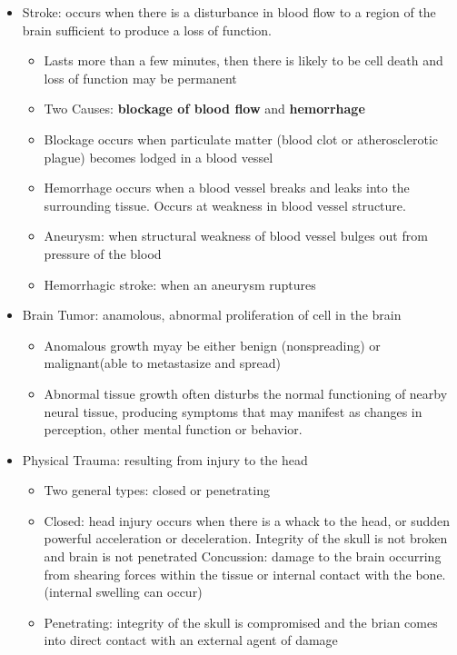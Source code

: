 \documentclass{article}
\begin{document}
\begin{itemize}
    \item Stroke: occurs when there is a disturbance in blood flow to a region of the brain sufficient to produce a loss of function. 
    \begin{itemize}
        \item Lasts more than a few minutes, then there is likely to be cell death and loss of function may be permanent
        \item Two Causes: \textbf{blockage of blood flow} and \textbf{hemorrhage}
        \item Blockage occurs when particulate matter (blood clot or atherosclerotic plague) becomes lodged in a blood vessel
        \item Hemorrhage occurs when a blood vessel breaks and leaks into the surrounding tissue. Occurs at weakness in blood vessel structure. 
        \item Aneurysm: when structural weakness of blood vessel bulges out from  pressure of the blood
        \item Hemorrhagic stroke: when an aneurysm ruptures
    \end{itemize}
    
    \item Brain Tumor: anamolous, abnormal proliferation of cell in the brain
    \begin{itemize}
        \item Anomalous growth myay be either benign (nonspreading) or malignant(able to metastasize and spread) 
        \item Abnormal tissue growth often disturbs the normal functioning of nearby neural tissue, producing symptoms that may manifest as changes in perception, other mental function or behavior. 
    \end{itemize}
    
    \item Physical Trauma: resulting from injury to the head
    \begin{itemize}
        \item Two general types: closed or penetrating
        \item Closed: head injury occurs when there is a whack to the head, or sudden powerful acceleration or deceleration. Integrity of the skull is not broken and brain is not penetrated
            \subitem Concussion: damage to the brain occurring from shearing forces within the tissue or internal contact with the bone. (internal swelling can occur) 
        \item Penetrating: integrity of the skull is compromised and the brian comes into direct contact with an external agent of damage
    \end{itemize}
    

\end{itemize}
\end{document}
